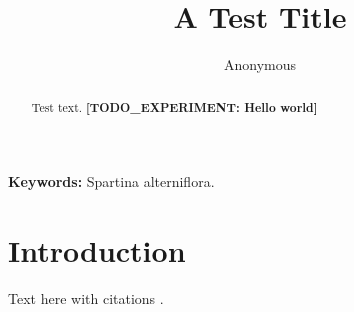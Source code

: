 \documentclass[11pt]{article}
\title{A Test Title}
\author{Anonymous}
\date{}
\newcommand{\TODOEXP}[1]{\textcolor{todocolor}{\textbf{[TODO_EXPERIMENT: #1]}}}
\begin{document}
\maketitle

\begin{abstract}
Test text. \TODOEXP{Hello world}
\end{abstract}

\textbf{Keywords:} Spartina alterniflora.

\section{Introduction}

Text here with citations \citep{an_1985_spartina, xu_2025_cmssm}.



\end{document}
